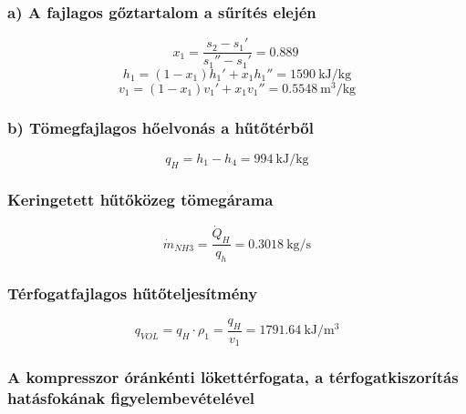 \noindent\hrulefill

\subsubsection*{a) A fajlagos gőztartalom a sűrítés elején}

\begin{equation}
   x_1
   = 
   \dfrac{s_2 - s_1'}{s_1'' - s_1'} 
   = 
   \SI{0,889}{}
\end{equation}
\begin{equation}
   h_1 = \left(1 - x_1\right) h_1' + x_1 h_1'' 
   = 
   \SI{1590}{\kilo\joule\per\kilogram}
\end{equation}
\begin{equation}
   v_1 = \left(1 - x_1\right) v_1' + x_1 v_1'' 
   = 
   \SI{0,5548}{\meter\cubed\per\kilogram}
\end{equation}
 
\subsubsection*{b) Tömegfajlagos hőelvonás a hűtőtérből}
 
\begin{equation}
  q_H = h_1-h_4 
  = 
  \SI{994}{\kilo\joule\per\kilogram}
\end{equation}
 
 \subsubsection*{Keringetett hűtőközeg tömegárama}
 
\begin{equation}
   {\dot{m}}_{NH3}= \dfrac{\dot{Q}_H}{q_h} = \SI{0,3018}{\kilogram\per\second}
\end{equation}

\subsubsection*{Térfogatfajlagos hűtőteljesítmény}
  
\begin{equation}
    {q}_{VOL} = q_H\cdot \rho_1
    =
    \dfrac{q_H}{v_1}
    =\SI{1791,64}{\kilo\joule\per\meter\cubed}
\end{equation} 
\subsubsection*{A kompresszor óránkénti lökettérfogata, a térfogatkiszorítás hatásfokának figyelembevételével}


